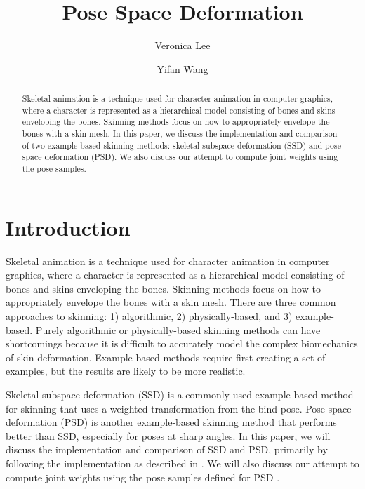 \documentclass[11pt,twocolumn,letterpaper]{article}
\begin{document}
\title{Pose Space Deformation}

\author{Veronica Lee\\
\and
Yifan Wang\\
}

\maketitle

\begin{abstract}
Skeletal animation is a technique used for character animation in computer graphics, where a character is represented as a hierarchical model consisting of bones and skins enveloping the bones. Skinning methods focus on how to appropriately envelope the bones with a skin mesh. In this paper, we discuss the implementation and comparison of two example-based skinning methods: skeletal subspace deformation (SSD) and pose space deformation (PSD). We also discuss our attempt to compute joint weights using the pose samples.
\end{abstract}

\section{Introduction}

Skeletal animation is a technique used for character animation in computer graphics, where a character is represented as a hierarchical model consisting of bones and skins enveloping the bones. Skinning methods focus on how to appropriately envelope the bones with a skin mesh. There are three common approaches to skinning: 1) algorithmic, 2) physically-based, and 3) example-based. Purely algorithmic or physically-based skinning methods can have shortcomings because it is difficult to accurately model the complex biomechanics of skin deformation. Example-based methods require first creating a set of examples, but the results are likely to be more realistic.

Skeletal subspace deformation (SSD) \cite{magnenat1988joint} is a commonly used example-based method for skinning that uses a weighted transformation from the bind pose. Pose space deformation (PSD) \cite{lewis2000pose} is another example-based skinning method that  performs better than SSD, especially for poses at sharp angles. In this paper, we will discuss the implementation and comparison of SSD and PSD, primarily by following the implementation as described in \cite{rhee2006real}. We will also discuss our attempt to compute joint weights using the pose samples defined for PSD \cite{wang2002multi, mohr2003direct}.
\end{document}
